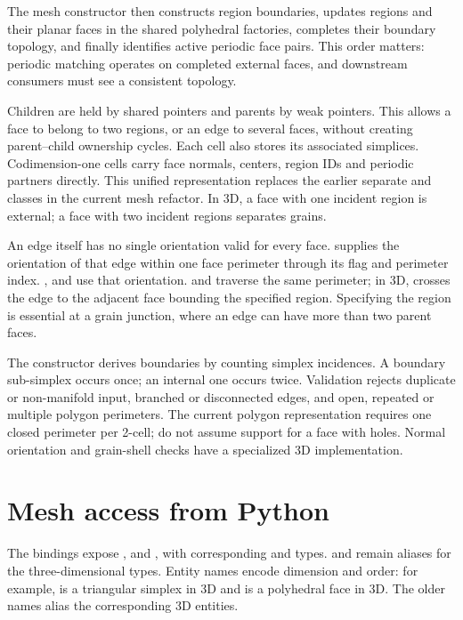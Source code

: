The mesh constructor then constructs region boundaries, updates regions and their planar faces in the shared polyhedral factories, completes their boundary topology, and finally identifies active periodic face pairs. This order matters: periodic matching operates on completed external faces, and downstream consumers must see a consistent topology.

Children are held by shared pointers and parents by weak pointers. This allows a face to belong to two regions, or an edge to several faces, without creating parent--child ownership cycles. Each cell also stores its associated simplices. Codimension-one cells carry face normals, centers, region IDs and periodic partners directly. This unified representation replaces the earlier separate  and  classes in the current mesh refactor. In 3D, a face with one incident region is external; a face with two incident regions separates grains.

An edge itself has no single orientation valid for every face.  supplies the orientation of that edge within one face perimeter through its  flag and perimeter index. ,  and  use that orientation.  and  traverse the same perimeter; in 3D,  crosses the edge to the adjacent face bounding the specified region. Specifying the region is essential at a grain junction, where an edge can have more than two parent faces.

The constructor derives boundaries by counting simplex incidences. A boundary sub-simplex occurs once; an internal one occurs twice. Validation rejects duplicate or non-manifold input, branched or disconnected edges, and open, repeated or multiple polygon perimeters. The current polygon representation requires one closed perimeter per 2-cell; do not assume support for a face with holes. Normal orientation and grain-shell checks have a specialized 3D implementation.

\section{Mesh access from Python}
The bindings expose ,  and , with corresponding  and  types.  and  remain aliases for the three-dimensional types. Entity names encode dimension and order: for example,  is a triangular simplex in 3D and  is a polyhedral face in 3D. The older  names alias the corresponding 3D entities.

